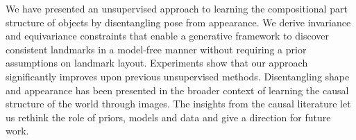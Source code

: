 	We have presented an unsupervised approach to learning the compositional part structure of objects by disentangling pose from appearance. We derive invariance and equivariance constraints that enable a generative framework to discover consistent landmarks in a model-free manner without requiring a prior assumptions on landmark layout. Experiments show that our approach significantly improves upon previous unsupervised methods.
	Disentangling shape and appearance has been presented in the broader context of learning the causal structure of the world through images. The insights from the causal literature let us rethink the role of priors, models and data and give a direction for future work.
